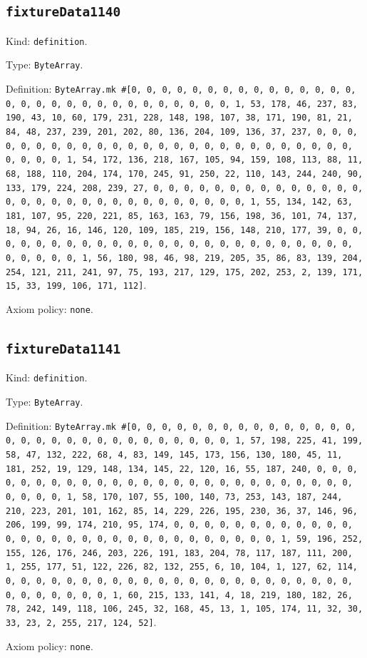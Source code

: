 \documentclass[11pt]{article}
\begin{document}
\subsection*{\texttt{fixtureData1140}}
\noindent Kind: \texttt{definition}.\par
\noindent Type: \texttt{ByteArray}.\par
\noindent Definition: \texttt{ByteArray.mk \#[0, 0, 0, 0, 0, 0, 0, 0, 0, 0, 0, 0, 0, 0, 0, 0, 0, 0, 0, 0, 0, 0, 0, 0, 0, 0, 0, 0, 0, 0, 1, 53, 178, 46, 237, 83, 190, 43, 10, 60, 179, 231, 228, 148, 198, 107, 38, 171, 190, 81, 21, 84, 48, 237, 239, 201, 202, 80, 136, 204, 109, 136, 37, 237, 0, 0, 0, 0, 0, 0, 0, 0, 0, 0, 0, 0, 0, 0, 0, 0, 0, 0, 0, 0, 0, 0, 0, 0, 0, 0, 0, 0, 0, 0, 1, 54, 172, 136, 218, 167, 105, 94, 159, 108, 113, 88, 11, 68, 188, 110, 204, 174, 170, 245, 91, 250, 22, 110, 143, 244, 240, 90, 133, 179, 224, 208, 239, 27, 0, 0, 0, 0, 0, 0, 0, 0, 0, 0, 0, 0, 0, 0, 0, 0, 0, 0, 0, 0, 0, 0, 0, 0, 0, 0, 0, 0, 0, 0, 1, 55, 134, 142, 63, 181, 107, 95, 220, 221, 85, 163, 163, 79, 156, 198, 36, 101, 74, 137, 18, 94, 26, 16, 146, 120, 109, 185, 219, 156, 148, 210, 177, 39, 0, 0, 0, 0, 0, 0, 0, 0, 0, 0, 0, 0, 0, 0, 0, 0, 0, 0, 0, 0, 0, 0, 0, 0, 0, 0, 0, 0, 0, 0, 1, 56, 180, 98, 46, 98, 219, 205, 35, 86, 83, 139, 204, 254, 121, 211, 241, 97, 75, 193, 217, 129, 175, 202, 253, 2, 139, 171, 15, 33, 199, 106, 171, 112]}.\par
\noindent Axiom policy: \texttt{none}.\par
\subsection*{\texttt{fixtureData1141}}
\noindent Kind: \texttt{definition}.\par
\noindent Type: \texttt{ByteArray}.\par
\noindent Definition: \texttt{ByteArray.mk \#[0, 0, 0, 0, 0, 0, 0, 0, 0, 0, 0, 0, 0, 0, 0, 0, 0, 0, 0, 0, 0, 0, 0, 0, 0, 0, 0, 0, 0, 0, 1, 57, 198, 225, 41, 199, 58, 47, 132, 222, 68, 4, 83, 149, 145, 173, 156, 130, 180, 45, 11, 181, 252, 19, 129, 148, 134, 145, 22, 120, 16, 55, 187, 240, 0, 0, 0, 0, 0, 0, 0, 0, 0, 0, 0, 0, 0, 0, 0, 0, 0, 0, 0, 0, 0, 0, 0, 0, 0, 0, 0, 0, 0, 0, 1, 58, 170, 107, 55, 100, 140, 73, 253, 143, 187, 244, 210, 223, 201, 101, 162, 85, 14, 229, 226, 195, 230, 36, 37, 146, 96, 206, 199, 99, 174, 210, 95, 174, 0, 0, 0, 0, 0, 0, 0, 0, 0, 0, 0, 0, 0, 0, 0, 0, 0, 0, 0, 0, 0, 0, 0, 0, 0, 0, 0, 0, 0, 0, 1, 59, 196, 252, 155, 126, 176, 246, 203, 226, 191, 183, 204, 78, 117, 187, 111, 200, 1, 255, 177, 51, 122, 226, 82, 132, 255, 6, 10, 104, 1, 127, 62, 114, 0, 0, 0, 0, 0, 0, 0, 0, 0, 0, 0, 0, 0, 0, 0, 0, 0, 0, 0, 0, 0, 0, 0, 0, 0, 0, 0, 0, 0, 0, 1, 60, 215, 133, 141, 4, 18, 219, 180, 182, 26, 78, 242, 149, 118, 106, 245, 32, 168, 45, 13, 1, 105, 174, 11, 32, 30, 33, 23, 2, 255, 217, 124, 52]}.\par
\noindent Axiom policy: \texttt{none}.\par
\end{document}
